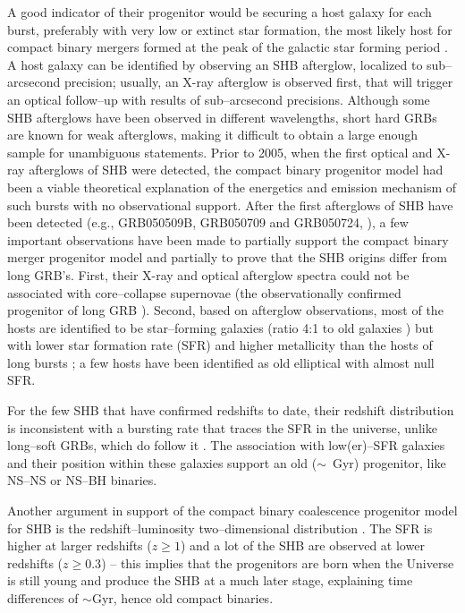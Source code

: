 A good indicator of their progenitor would be securing a host galaxy for each burst, preferably with very low or extinct star formation, the most likely host for compact binary mergers formed at the peak of the galactic star forming period \cite{Kelley:2010qx}. A host galaxy can be identified by observing an \ac{SHB} afterglow, localized to sub--arcsecond precision; usually, an X-ray afterglow is observed first, that will trigger an optical follow--up with results of sub--arcsecond precisions. Although some \ac{SHB} afterglows have been observed in different wavelengths, short hard GRBs are known for weak afterglows, making it difficult to obtain a large enough sample for unambiguous statements. Prior to 2005, when the first optical and X-ray afterglows of SHB were detected, the compact binary progenitor model had been a viable theoretical explanation of the energetics and emission mechanism of such bursts with no observational support. After the first afterglows of SHB have been detected (e.g., GRB050509B, GRB050709 and GRB050724, \cite{Pedersen:2005kh, Nakar:2007xe}), a few important observations have been made to partially support the compact binary merger progenitor model and partially to prove that the SHB origins differ from long GRB's. First, their X-ray and optical afterglow spectra could not be associated with core--collapse supernovae (the observationally confirmed progenitor of long GRB \cite{Woosley:2006fn}). Second, based on afterglow observations, most of the hosts are identified to be star--forming galaxies (ratio 4:1 to old galaxies \cite{Berger:2010qx}) but with lower star formation rate (SFR) and higher metallicity than the hosts of long bursts \cite{Berger:2010qx}; a few hosts have been identified as old elliptical with almost null SFR. 

For the few SHB that have confirmed redshifts to date, their redshift distribution is inconsistent with a bursting rate that traces the SFR in the universe, unlike long--soft GRBs, which do follow it \cite{Prochaska:2005qf}. The association with low(er)--SFR galaxies and their position within these galaxies support an old ($\sim$~Gyr) progenitor, like NS--NS or NS--BH binaries.

Another argument in support of the compact binary coalescence progenitor model for \ac{SHB} is the redshift--luminosity two--dimensional distribution \cite{Nakar:2007}. The SFR is higher at larger redshifts ($z \geq 1$) and a lot of the \ac{SHB} are observed at lower redshifts ($z \geq 0.3$) -- this implies that the progenitors are born when the Universe is still young and produce the \ac{SHB} at a much later stage, explaining time differences of $\sim$Gyr, hence old compact binaries.

